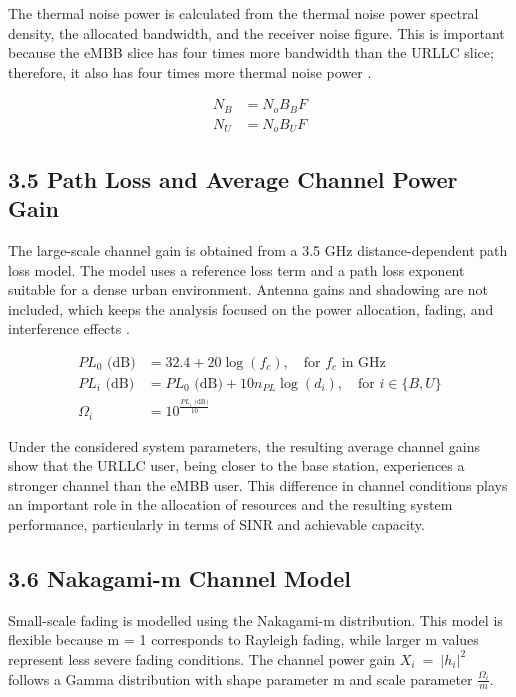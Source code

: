 \documentclass[
]{article}
\begin{document}
The thermal noise power is calculated from the thermal noise power
spectral density, the allocated bandwidth, and the receiver noise
figure. This is important because the eMBB slice has four times more
bandwidth than the URLLC slice; therefore, it also has four times more
thermal noise power \parencite{Men2017}.

\begin{align}
N_{B} &= N_{o} B_{B} F \\[1ex]
N_{U} &= N_{o} B_{U} F
\end{align}

\subsection{3.5 Path Loss and Average Channel Power
Gain}\label{path-loss-and-average-channel-power-gain}

The large-scale channel gain is obtained from a 3.5 GHz
distance-dependent path loss model. The model uses a reference loss term
and a path loss exponent suitable for a dense urban environment. Antenna
gains and shadowing are not included, which keeps the analysis focused
on the power allocation, fading, and interference effects .

\begin{align}
PL_{0}\text{ (dB)} &= 32.4 + 20\log(f_{c}), \quad \text{for } f_{c} \text{ in GHz} \\[1ex]
PL_{i}\text{ (dB)} &= PL_{0}\text{ (dB)} + 10n_{PL}\log(d_{i}), \quad \text{for } i \in \{B,U\} \\[1ex]
\Omega_{i} &= 10^{\frac{PL_{i}\text{ (dB)}}{10}}
\end{align}

Under the considered system parameters, the resulting average channel gains show that the URLLC user, being closer to the base station, experiences a stronger channel than the eMBB user. This difference in channel conditions plays an important role in the allocation of resources and the resulting system performance, particularly in terms of SINR and achievable capacity.

\subsection{3.6 Nakagami-m Channel
Model}\label{nakagami-m-channel-model}

Small-scale fading is modelled using the Nakagami-m distribution. This
model is flexible because m = 1 corresponds to Rayleigh fading, while
larger m values represent less severe fading conditions. The channel
power gain \(X_{i}\  = \ {|h_{i}|}^{2}\) follows a Gamma distribution
with shape parameter m and scale parameter \(\frac{\Omega_{i}}{m}\).
\end{document}

